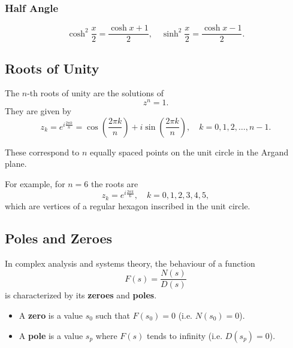 \documentclass[a4paper,12pt]{article}
\begin{document}
\subsubsection{Half Angle}
\[
\cosh^2\frac{x}{2} = \frac{\cosh x + 1}{2}, \quad
\sinh^2\frac{x}{2} = \frac{\cosh x - 1}{2}.
\]

\subsection{Roots of Unity}
The $n$-th roots of unity are the solutions of
\[
z^n = 1.
\]
They are given by
\[
z_k = e^{i \frac{2\pi k}{n}} = \cos\left(\frac{2\pi k}{n}\right) + i\sin\left(\frac{2\pi k}{n}\right),
\quad k = 0,1,2,\dots,n-1.
\]

These correspond to $n$ equally spaced points on the unit circle in the Argand plane.

\begin{center}
\end{center}

For example, for $n=6$ the roots are
\[
z_k = e^{i\frac{2\pi k}{6}}, \quad k=0,1,2,3,4,5,
\]
which are vertices of a regular hexagon inscribed in the unit circle.

\subsection{Poles and Zeroes}

In complex analysis and systems theory, the behaviour of a function
\[
F(s) = \frac{N(s)}{D(s)}
\]
is characterized by its \textbf{zeroes} and \textbf{poles}.
\begin{itemize}
    \item A \textbf{zero} is a value $s_0$ such that $F(s_0) = 0$ (i.e. $N(s_0) = 0$).
    \item A \textbf{pole} is a value $s_p$ where $F(s)$ tends to infinity (i.e. $D(s_p) = 0$).
\end{itemize}
\end{document}
